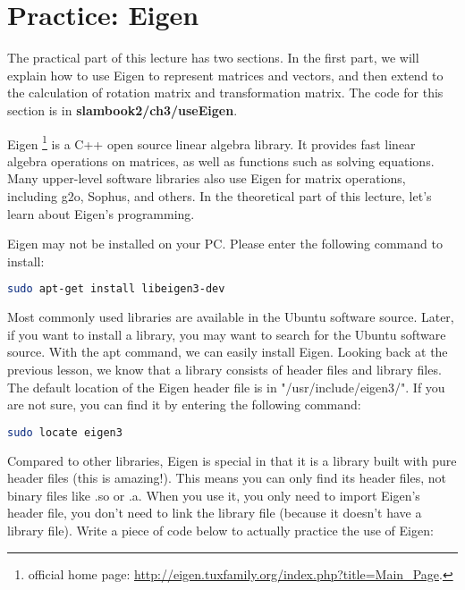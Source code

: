 \section{Practice: Eigen}

The practical part of this lecture has two sections. In the first part, we will explain how to use Eigen to represent matrices and vectors, and then extend to the calculation of rotation matrix and transformation matrix. The code for this section is in \textbf{slambook2/ch3/useEigen}.

Eigen \footnote{official home page: \url{http://eigen.tuxfamily.org/index.php?title=Main_Page}. } is a C++ open source linear algebra library. It provides fast linear algebra operations on matrices, as well as functions such as solving equations. Many upper-level software libraries also use Eigen for matrix operations, including g2o, Sophus, and others. In the theoretical part of this lecture, let's learn about Eigen's programming.

Eigen may not be installed on your PC. Please enter the following command to install:

\begin{lstlisting}[language=sh,caption=terminal input:]
sudo apt-get install libeigen3-dev
\end{lstlisting}

Most commonly used libraries are available in the Ubuntu software source. Later, if you want to install a library, you may want to search for the Ubuntu software source. With the apt command, we can easily install Eigen. Looking back at the previous lesson, we know that a library consists of header files and library files. The default location of the Eigen header file is in "/usr/include/eigen3/". If you are not sure, you can find it by entering the following command:

\begin{lstlisting}[language=sh,caption=terminal input:]
sudo locate eigen3
\end{lstlisting}

Compared to other libraries, Eigen is special in that it is a library built with pure header files (this is amazing!). This means you can only find its header files, not binary files like .so or .a. When you use it, you only need to import Eigen's header file, you don't need to link the library file (because it doesn't have a library file). Write a piece of code below to actually practice the use of Eigen:

